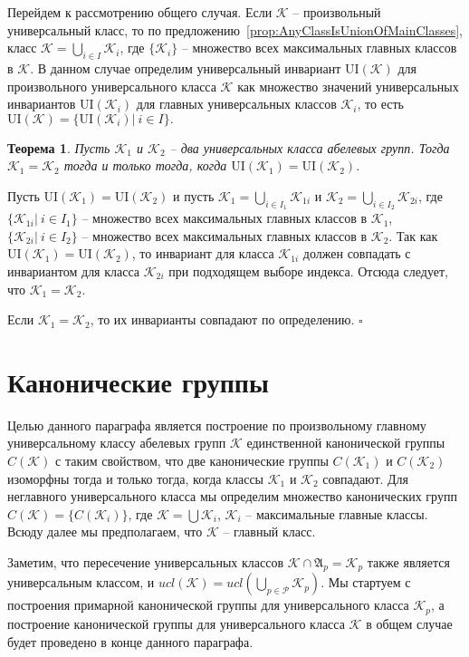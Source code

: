 \documentclass[a4paper,11pt,twoside]{article}
\newtheorem{theorem}{Теорема}[section]
\def\proof{{\noindent{\bf Доказательство.}} }
\def\A{{\mathfrak{A}}}
\def\K{{\mathcal{K}}}
\def\P{{\mathcal{P}}}
\def\ui{{\mathrm{UI}}}
\begin{document}
Перейдем к рассмотрению общего случая. Если $\K$ -- произвольный универсальный класс, то по предложению~\ref{prop:AnyClassIsUnionOfMainClasses}, класс $\K = \bigcup\limits_{i \in I} \K_i$, где $\{\K_i\}$ -- множество всех максимальных главных классов в $\K$. В данном случае определим универсальный инвариант $\ui(\K)$ для произвольного универсального класса $\K$ как множество значений универсальных инвариантов $\ui(\K_i)$ для главных универсальных классов $\K_i$, то есть $\ui(\K) = \{\ui(\K_i) | \ i \in I\}.$

\begin{theorem}\label{th:UnivEquivAnyClasses}
Пусть $\K_1$ и $\K_2$ -- два универсальных класса абелевых групп. Тогда $\K_1 = \K_2$ тогда и только тогда, когда $\ui(\K_1) = \ui(\K_2)$.
\end{theorem}

\proof Пусть $\ui(\K_1) = \ui(\K_2)$ и пусть $\K_1 = \bigcup\limits_{i \in I_1} \K_{1i}$ и $\K_2 = \bigcup\limits_{i \in I_2} \K_{2i}$, где $\{\K_{1i} | \ i \in I_1\}$ -- множество всех максимальных главных классов в $\K_1$, $\{\K_{2i} | \ i \in I_2\}$ -- множество всех максимальных главных классов в $\K_2$. Так как $\ui(\K_1) = \ui(\K_2)$, то инвариант для класса $\K_{1i}$ должен совпадать с инвариантом для класса $\K_{2i}$ при подходящем выборе индекса. Отсюда следует, что $\K_1 = \K_2$. 

Если $\K_1 = \K_2$, то их инварианты совпадают по определению. $\square$


\section{Канонические группы}\label{sec:CannonicalGroups}

Целью данного параграфа является построение по произвольному главному универсальному классу абелевых групп $\K$ единственной канонической группы $C(\K)$ с таким свойством, что две канонические группы $C(\K_1)$ и $C(\K_2)$ изоморфны тогда и только тогда, когда классы $\K_1$ и $\K_2$ совпадают. Для неглавного универсального класса мы определим множество канонических групп $C(\K) = \{C(\K_i)\}$, где $\K = \bigcup \K_i$, $\K_i$ -- максимальные главные классы. Всюду далее мы предполагаем, что $\K$ -- главный класс. 

Заметим, что пересечение универсальных классов $\K \cap \A_p = \K_p$ также является универсальным классом, и $ucl(\K) = ucl(\bigcup\limits_{p \in \P} \K_p)$. Мы стартуем с построения примарной канонической группы для универсального класса $\K_p$, а построение канонической группы для универсального класса $\K$ в общем случае будет проведено в конце данного параграфа.
\end{document}
